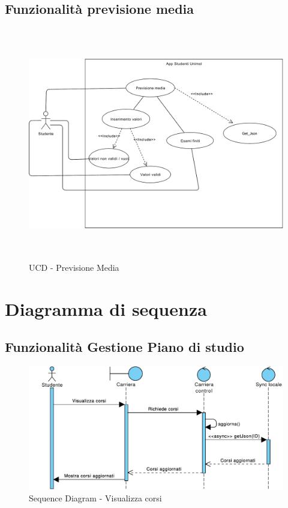 \clearpage

\subsection{Funzionalità previsione media}
\begin{figure}[H]
	\centering
	\includegraphics[height=4in]{imgs/gruppo3/caso-duso-media.pdf}
	\caption{UCD - Previsione Media}
	\label{fig:prova}
\end{figure}

\clearpage

\section{Diagramma di sequenza}

\subsection{Funzionalità Gestione Piano di studio}
\begin{figure}[h]
	\centering
	\includegraphics[width=6.5in]{imgs/gruppo1/sequence_diagrams/SD1_visualizza_corsi.pdf}
	\caption{Sequence Diagram - Visualizza corsi}
	\label{diag:visualizzaCorsiSD}
\end{figure}


